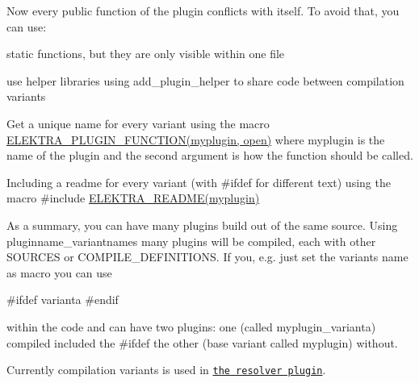 Now every public function of the plugin conflicts with itself. To avoid that, you can use\+:
\begin{DoxyItemize}
\item static functions, but they are only visible within one file
\item use helper libraries using add\+\_\+plugin\+\_\+helper to share code between compilation variants
\item Get a unique name for every variant using the macro {\ttfamily \hyperlink{group__plugin_ga34d1a66f0a6e89cfd20f4014a9975a2a}{E\+L\+E\+K\+T\+R\+A\+\_\+\+P\+L\+U\+G\+I\+N\+\_\+\+F\+U\+N\+C\+T\+I\+O\+N(myplugin, open)}} where myplugin is the name of the plugin and the second argument is how the function should be called.
\item Including a readme for every variant (with \#ifdef for different text) using the macro {\ttfamily \#include \hyperlink{group__plugin_ga78d616f68bf9fb0942f66478597467c6}{E\+L\+E\+K\+T\+R\+A\+\_\+\+R\+E\+A\+D\+M\+E(myplugin)}}
\end{DoxyItemize}

As a summary, you can have many plugins build out of the same source. Using pluginname\+\_\+variantnames many plugins will be compiled, each with other S\+O\+U\+R\+C\+E\+S or C\+O\+M\+P\+I\+L\+E\+\_\+\+D\+E\+F\+I\+N\+I\+T\+I\+O\+N\+S. If you, e.\+g. just set the variants name as macro you can use \begin{DoxyVerb}    #ifdef varianta
    #endif
\end{DoxyVerb}


within the code and can have two plugins\+: one (called myplugin\+\_\+varianta) compiled included the {\ttfamily \#ifdef} the other (base variant called myplugin) without.

Currently compilation variants is used in \href{http://libelektra.org/tree/master/src/plugins/resolver/resolver.c}{\tt the resolver plugin}. 